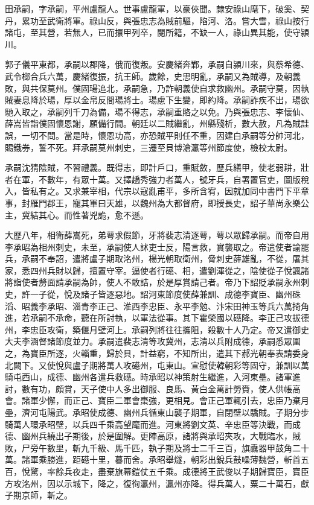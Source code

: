 \begin{pinyinscope}
 田承嗣，字承嗣，平州盧龍人。世事盧龍軍，以豪俠聞。隸安祿山麾下，破奚、契丹，累功至武衛將軍。祿山反，與張忠志為賊前驅，陷河、洛。嘗大雪，祿山按行諸屯，至其營，若無人，已而擐甲列卒，閱所籍，不缺一人，祿山異其能，使守潁川。



 郭子儀平東都，承嗣以郡降，俄而復叛。安慶緒奔鄴，承嗣自潁川來，與蔡希德、武令榔合兵六萬，慶緒復振，抗王師。歲餘，史思明亂，承嗣又為賊導，及朝義敗，與共保莫州。僕固瑒追北，承嗣急，乃詐朝義使自求救幽州。承嗣守莫，因執賊妻息降於瑒，厚以金帛反間瑒將士。瑒慮下生變，即約降。承嗣詐疾不出，瑒欲馳入取之，承嗣列千刀為備，瑒不得志，承嗣重賂之以免。乃與張忠志、李懷仙、薛嵩皆詣僕固懷恩謝，願備行間。朝廷以二賊繼亂，州縣殘析，數大赦，凡為賊詿誤，一切不問。當是時，懷恩功高，亦恐賊平則任不重，因建白承嗣等分帥河北，賜鐵券，誓不死。拜承嗣莫州刺史，三遷至貝博滄瀛等州節度使，檢校太尉。



 承嗣沈猜陰賊，不習禮義。既得志，即計戶口，重賦斂，歷兵繕甲，使老弱耕，壯者在軍，不數年，有眾十萬。又擇趫秀強力者萬人，號牙兵，自署置官吏，圖版稅入，皆私有之。又求兼宰相，代宗以寇亂甫平，多所含宥，因就加同中書門下平章事，封雁門郡王，寵其軍曰天雄，以魏州為大都督府，即授長史，詔子華尚永樂公主，冀結其心。而性著兇詭，愈不遜。



 大歷八年，相衛薛嵩死，弟萼求假節，牙將裴志清逐萼，萼以眾歸承嗣。而帝自用李承昭為相州刺史，未至，承嗣使人訹吏士反，陽言救，實襲取之。帝遣使者諭罷兵，承嗣不奉詔，遣將盧子期取洺州，楊光朝取衛州，脅刺史薛雄亂，不從，屠其家，悉四州兵財以歸，擅置守宰。逼使者行礠、相，遣劉渾從之，陰使從子悅諷諸將詣使者剺面請承嗣為帥，使人不敢詰，於是厚賞請己者。帝乃下詔貶承嗣永州刺史，許一子從，悅及諸子皆逐惡地。詔河東節度使薛兼訓、成德李寶臣、幽州硃滔、昭義李承昭、淄青李正己、淮西李忠臣、永平李勉、汴宋田神玉等兵六萬掎角進，若承嗣不承命，聽在所討執，以軍法從事。其下霍榮國以礠降。李正己攻拔德州，李忠臣攻衛，築偃月壁河上。承嗣列將往往攜阻，殺數十人乃定。帝又遣御史大夫李涵督諸節度並力。承嗣遣裴志清等攻冀州，志清以兵附成德，承嗣悉眾圍之，為寶臣所逐，火輜重，歸於貝，計益窮，不知所出，遣其下郝光朝奉表請委身北闕下。又使悅與盧子期將萬人攻礠州，屯東山。宣慰使韓朝彩等固守，兼訓以萬騎屯西山，成德、幽州各遣兵救礠。時承昭以神策射生繼進，入河東壘。諸軍進討，數有功，頗賞，天子使中人多出御服、良馬、黃白金萬計勞賚，使人供帳高會。諸軍少懈，而正己、寶臣二軍會棗強，更相見。會正己軍輒引去，忠臣乃棄月壘，濟河屯陽武。承昭使成德、幽州兵循東山襲子期軍，自閉壁以驕賊。子期分步騎萬人環承昭壁，以兵四千乘高望麾而進。河東將劉文英、辛忠臣等決戰，而成德、幽州兵繞出子期後，於是圍解。更陣高原，諸將與承昭夾攻，大戰臨水，賊敗，尸旁午數里，斬九千級、馬千匹，執子期及將士二千三百，旗纛器甲鼓角二十萬。諸軍乘勝進，距礠十里，暮而舍。承昭舉燧，朝彩出銳兵鼓噪薄魏營，斬首五百，悅驚，率餘兵夜走，盡棄旗幕鎧仗五千乘。成德將王武俊以子期歸寶臣，寶臣方攻洺州，因以示城下，降之，復徇瀛州，瀛州亦降。得兵萬人，粟二十萬石，獻子期京師，斬之。




\end{pinyinscope}
